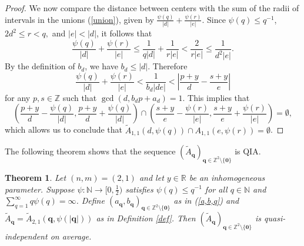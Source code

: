 \documentclass[reqno]{amsart}
\newtheorem{theorem}{Theorem}
\theoremstyle{definition}
\theoremstyle{remark}
\begin{document}
\begin{proof}
    We now compare the distance between centers with the sum of the radii of intervals in the unions (\ref{union}), given by $\frac{\psi(q)}{|d|} + \frac{\psi(r)}{|e|}$. Since $\psi(q) \leq q^{-1}$, $2d^2 \leq r<q,$ and $|e|<|d|$, it follows that
    $$\frac{\psi(q)}{|d|} + \frac{\psi(r)}{|e|} \leq \frac{1}{q|d|} + \frac{1}{r|e|} < \frac{2}{r|e|} \leq \frac{1}{d^2|e|}.$$
    By the definition of $b_d$, we have $b_d \leq |d|$. Therefore
    $$\frac{\psi(q)}{|d|} + \frac{\psi(r)}{|e|} < \frac{1}{b_d |de|} < \left| \frac{p+y}{d} - \frac{s+y}{e} \right|$$
    for any $p,s \in \mathbb{Z}$ such that $\gcd(d, b_dp+a_d) = 1$. This implies that
    $$\left(\frac{p+y}{d} -\frac{\psi(q)}{|d|}, \frac{p+y}{d} + \frac{\psi(q)}{|d|} \right) \cap \left(\frac{s+y}{e} - \frac{\psi(r)}{|e|}, \frac{s+y}{e} + \frac{\psi(r)}{|e|} \right) = \emptyset,$$
    which allows us to conclude that $\tilde A_{1,1} (d, \psi(q)) \cap A_{1,1}(e, \psi(r)) = \emptyset$.
\end{proof}
The following theorem shows that the sequence $(\tilde{A}_\mathbf{q})_{\mathbf{q} \in \mathbb{Z}^2 \setminus \{\mathbf{0}\}}$ is QIA.
\begin{theorem}\label{thm3}
    Let $(n,m) = (2,1)$ and let $y \in \mathbb{R}$ be an inhomogeneous parameter. Suppose $\psi : \mathbb{N} \to [0,\frac{1}{2})$ satisfies $\psi(q) \leq q^{-1}$ for all $q \in \mathbb{N}$ and $\sum_{q=1}^\infty q\psi(q) =\infty$. Define $(a_\mathbf{q}, b_\mathbf{q})_{\mathbf{q} \in \mathbb{Z}^2 \setminus \{\mathbf{0}\}}$ as in (\ref{a,b,q}) and  $\tilde{A}_\mathbf{q}=\tilde{A}_{2,1}(\mathbf{q}, \psi(|\mathbf{q}|))$ as in Definition \ref{def}. Then $(\tilde A_\mathbf{q})_{\mathbf{q} \in \mathbb{Z}^2 \setminus \{\mathbf{0}\}}$ is quasi-independent on average.
\end{theorem}
\end{document}
